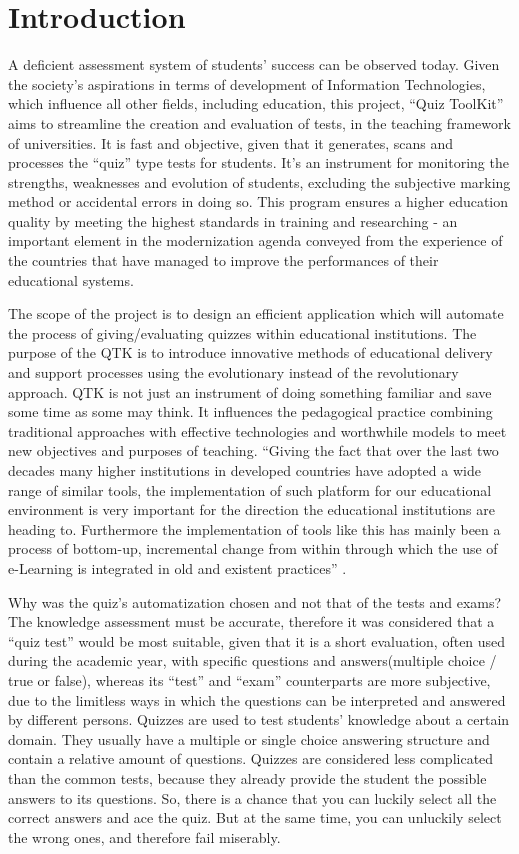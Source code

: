 \section*{Introduction}


A deficient assessment system of students’ success can be observed today. Given the society’s  aspirations in terms of development of Information Technologies, which influence all other fields, including education, this project, “Quiz ToolKit” aims to streamline the creation and evaluation of tests, in the teaching framework of universities. It is fast and objective, given that it generates, scans and processes the “quiz” type tests for students. It’s an instrument for monitoring the strengths, weaknesses and evolution of students, excluding the subjective marking method or accidental errors in doing so. This program ensures a higher education quality by meeting the highest standards in training and researching - an important element in the modernization agenda conveyed from the experience of the countries that have managed to improve the performances of their educational systems.

The scope of the project is to design an efficient application which will automate the process of giving/evaluating quizzes within educational institutions. The purpose of the QTK is to introduce innovative methods of educational delivery and support processes using the evolutionary instead of the revolutionary approach. QTK is not just an instrument of doing something familiar and save some time as some may think. It influences the pedagogical practice combining traditional approaches with effective technologies and worthwhile models to meet new objectives and purposes of teaching. ``Giving the fact that over the last two decades many higher institutions in developed countries have adopted a wide range of similar tools, the implementation of such platform for our educational environment is very important for the direction the educational institutions are heading to. Furthermore the implementation of tools like this has mainly been a process of bottom-up, incremental change from within through which the use of e-Learning is integrated in old and existent practices'' \cite{introduction_collins}.

Why was the quiz’s automatization chosen and not that of the tests and exams? The knowledge assessment must be accurate, therefore it was considered that a “quiz test” would be most suitable, given that it is a short evaluation, often used during the academic year, with specific questions and answers(multiple choice / true or false), whereas its “test” and “exam” counterparts are more subjective, due to the limitless ways in which the questions can be interpreted and answered by different persons.
Quizzes are used to test students’ knowledge about a certain domain. They usually have a multiple or single choice answering structure and contain a relative amount of questions. Quizzes are considered less complicated than the common tests, because they already provide the student the possible answers to its questions. So, there is a chance that you can luckily select all the correct answers and ace the quiz. But at the same time, you can unluckily select the wrong ones, and therefore fail miserably.

